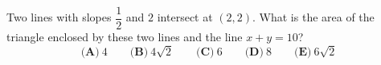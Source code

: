 Two lines with slopes $\dfrac12$ and $2$ intersect at $(2,2)$. What is the area of the triangle enclosed by these two lines and the line $x+y=10$?
\[\textbf{(A)}\ 4\qquad\textbf{(B)}\ 4\sqrt2\qquad\textbf{(C)}\ 6\qquad\textbf{(D)}\ 8\qquad\textbf{(E)}\ 6\sqrt2\]

